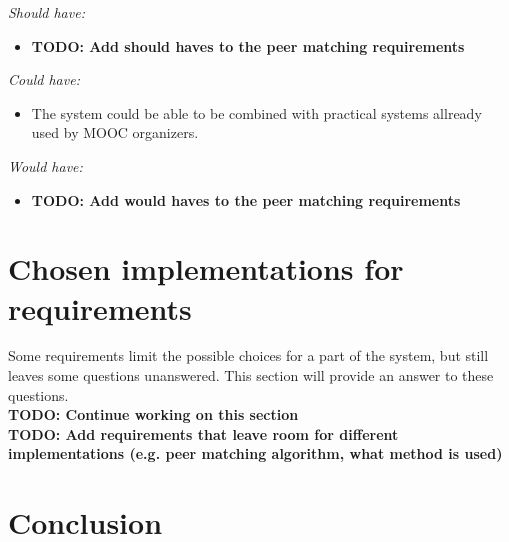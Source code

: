 \documentclass[]{article}
\newcommand{\TODO}[1]{{\color{red}\textbf{TODO: #1}}}
\newcommand{\reqr}[1]{{\noindent\emph{#1:}}}
\begin{document}
\reqr{Should have}
\begin{itemize}
\item \TODO{Add should haves to the peer matching requirements}
\end{itemize}

\reqr{Could have}
\begin{itemize}
\item The system could be able to be combined with practical systems allready used by MOOC organizers.
\end{itemize}

\reqr{Would have}
\begin{itemize}
\item \TODO{Add would haves to the peer matching requirements}
\end{itemize}

\section{Chosen implementations for requirements}
Some requirements limit the possible choices for a part of the system, but still leaves some questions unanswered. This section will provide an answer to these questions.\\
\TODO{Continue working on this section}\\
\TODO{Add requirements that leave room for different implementations (e.g. peer matching algorithm, what method is used)}

\section{Conclusion}

\newpage


\end{document}
